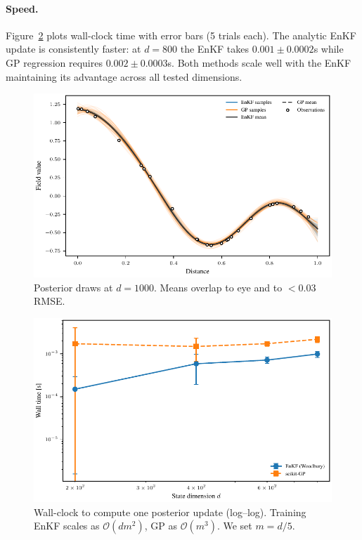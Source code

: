 \documentclass[runningheads]{llncs}
\begin{document}
\paragraph{Speed.}
Figure~\ref{fig:posterior-timing} plots wall-clock time with error bars (5 trials each).
The analytic EnKF update is consistently faster:
at $d=800$ the EnKF takes $0.001\pm0.0002$s while
GP regression requires $0.002\pm0.0003$s.
Both methods scale well with the EnKF maintaining its advantage across all tested dimensions.

\begin{figure}
  \centering
  \includegraphics[width=\linewidth]{fig_posterior_samples.pdf}
  \caption{Posterior draws at $d=1000$.
           Means overlap to eye and to $<\!0.03$ RMSE.}
  \label{fig:posterior-samples}
\end{figure}

\begin{figure}
  \centering
  \includegraphics[width=\linewidth]{fig_posterior_timing.pdf}
  \caption{Wall-clock to compute one posterior update
           (log–log). Training EnKF scales as $\mathcal O(dm^{2})$, GP as $\mathcal O(m^{3})$. We set $m=d/5$.}%
            \label{fig:posterior-timing}
\end{figure}
\end{document}
